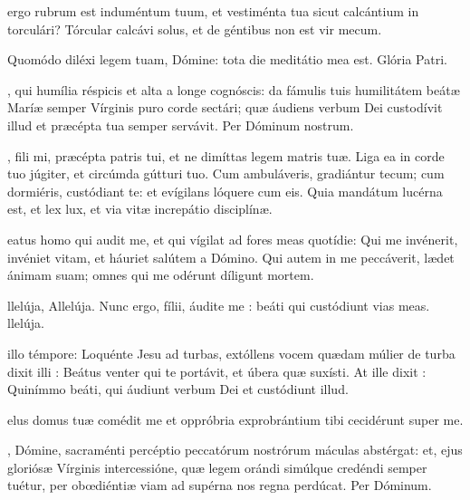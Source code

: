 \documentclass[fontsize=9.5pt,paper=A6,twoside,BCOR=1mm,DIV=21,headinclude]{scrarticle}
\begin{document}
\renewcommand{\section}{}
\thispagestyle{empty}
\begin{multicols}{2}

 ergo rubrum est induméntum tuum, et vestiménta tua sicut calcántium in torculári? Tórcular calcávi solus, et de géntibus non est vir mecum.

 Quomódo diléxi legem tuam, Dómine: tota die meditátio mea est. \V Glória Patri.

, qui humília réspicis et alta a longe cognóscis: da fámulis tuis humilitátem beátæ Maríæ semper Vírginis puro corde sectári; quæ áudiens verbum Dei custodívit illud et præcépta tua semper servávit. Per Dóminum nostrum.

, fili mi, præcépta patris tui, et ne dimíttas legem matris tuæ. Liga ea in corde tuo júgiter, et circúmda gútturi tuo. Cum ambuláveris, gradiántur tecum; cum dormiéris, custódiant te: et evígilans lóquere cum eis. Quia mandátum lucérna est, et lex lux, et via vitæ increpátio disciplínæ.

eatus homo qui audit me, et qui vígilat ad fores meas quotídie: Qui me invénerit, invéniet vitam, et háuriet salútem a Dómino. 
\V Qui autem in me peccáverit, lædet ánimam suam; omnes qui me odérunt díligunt mortem.

llelúja, Allelúja. \V {} Nunc ergo, fílii, áudite me :
beáti qui custódiunt vias meas. llelúja.

 illo témpore: Loquénte Jesu ad turbas, extóllens vocem quædam múlier de turba dixit illi : Beátus venter qui te portávit, et úbera quæ suxísti. At ille dixit : Quinímmo beáti, qui áudiunt verbum Dei et custódiunt illud.

elus domus tuæ comédit me et oppróbria exprobrántium tibi cecidérunt super me.

, Dómine, sacraménti percéptio peccatórum nostrórum máculas abstérgat: et,
ejus gloriósæ Vírginis intercessióne, quæ legem orándi simúlque credéndi semper tuétur,
per obœdiéntiæ viam ad supérna nos regna perdúcat. Per Dóminum.


\end{multicols}
\end{document}
